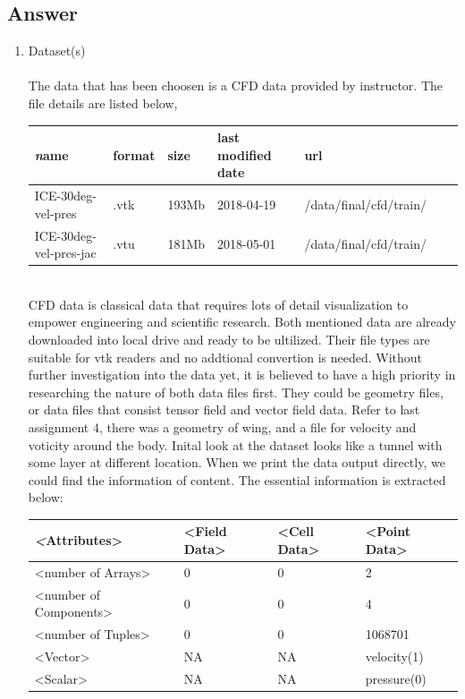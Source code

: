 \documentclass[
	12pt, %
]{fphw}
\begin{document}
\subsection*{Answer}
\begin{enumerate}[(\itshape 1\normalfont)]
\item Dataset(s)\\\\
The data that has been choosen is a CFD data provided by instructor. The file details are listed below,
\\
		\begin{tabular}{l l l l l l l}
			\toprule
			\textit name & format & size & last modified date & url\\
			\midrule
				ICE-30deg-vel-pres & .vtk & 193Mb & 2018-04-19 & /data/final/cfd/train/\\
			ICE-30deg-vel-pres-jac	 & .vtu & 181Mb  & 2018-05-01 & /data/final/cfd/train/\\
			\bottomrule
		\end{tabular}\\
CFD data is classical data that requires lots of detail visualization to empower engineering and scientific research. Both mentioned data are already downloaded into local drive and ready to be ultilized. Their file types are suitable for vtk readers and no addtional convertion is needed. Without further investigation into the data yet, it is believed to have a high priority in researching the nature of both data files first. They could be geometry files, or data files that consist tensor field and vector field data. Refer to last assignment 4, there was a geometry of wing, and a file for velocity and voticity around the body. Inital look at the dataset looks like a tunnel with some layer at different location.
When we print the data output directly, we could find the information of content. The essential information is extracted below:\\
\begin{tabular}{l l l l}
			\toprule
			\textit <Attributes> & <Field Data> & <Cell Data> & <Point Data>\\
			\midrule
				<number of Arrays> & 0 & 0 & 2 \\
				<number of Components> & 0 & 0 & 4 \\
			   <number of Tuples> & 0 & 0 & 1068701 \\
			   <Vector> & NA & NA & velocity(1) \\
			   <Scalar> & NA & NA & pressure(0) \\

\end{tabular}
\end{enumerate}
\end{document}
